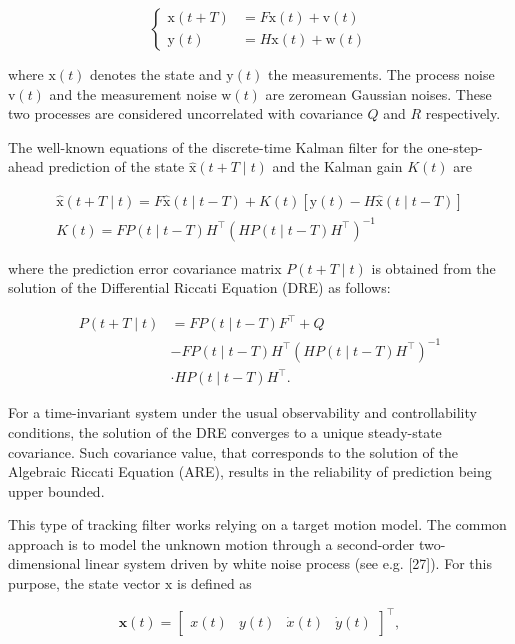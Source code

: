 \documentclass[conference]{IEEEtran}
\begin{document}
\[
\left\{\begin{array}{cl}
\mathrm{x}(t+T) & =F \mathrm{x}(t)+\mathrm{v}(t)  \tag{21}\\
\mathrm{y}(t) & =H \mathrm{x}(t)+\mathrm{w}(t)
\end{array}\right.
\]

where $\mathrm{x}(t)$ denotes the state and $\mathrm{y}(t)$ the measurements. The process noise $\mathrm{v}(t)$ and the measurement noise $\mathrm{w}(t)$ are zeromean Gaussian noises. These two processes are considered uncorrelated with covariance $Q$ and $R$ respectively.

The well-known equations of the discrete-time Kalman filter for the one-step-ahead prediction of the state $\hat{\mathrm{x}}(t+T \mid t)$ and the Kalman gain $K(t)$ are


\begin{gather*}
\hat{\mathrm{x}}(t+T \mid t)=F \hat{\mathrm{x}}(t \mid t-T)+K(t)[\mathrm{y}(t)-H \hat{\mathrm{x}}(t \mid t-T)]  \tag{22}\\
K(t)=F P(t \mid t-T) H^{\top}\left(H P(t \mid t-T) H^{\top}\right)^{-1} \tag{23}
\end{gather*}


where the prediction error covariance matrix $P(t+T \mid t)$ is obtained from the solution of the Differential Riccati Equation (DRE) as follows:


\begin{align*}
P(t+T \mid t) & =F P(t \mid t-T) F^{\top}+Q \\
& -F P(t \mid t-T) H^{\top}\left(H P(t \mid t-T) H^{\top}\right)^{-1}  \tag{24}\\
& \cdot H P(t \mid t-T) H^{\top} .
\end{align*}

For a time-invariant system under the usual observability and controllability conditions, the solution of the DRE converges to a unique steady-state covariance. Such covariance value, that corresponds to the solution of the Algebraic Riccati Equation (ARE), results in the reliability of prediction being upper bounded.

This type of tracking filter works relying on a target motion model. The common approach is to model the unknown motion through a second-order two-dimensional linear system driven by white noise process (see e.g. [27]). For this purpose, the state vector $\mathrm{x}$ is defined as

\[
\mathbf{x}(t)=\left[\begin{array}{llll}
x(t) & y(t) & \dot{x}(t) & \dot{y}(t) \tag{25}
\end{array}\right]^{\top},
\]
\end{document}
